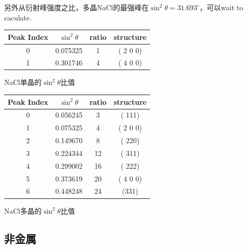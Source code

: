 \documentclass[10pt]{ctexart}
\begin{document}
另外从衍射峰强度之比，多晶NaCl的最强峰在$\sin^2{\theta}= 31.693^\circ$，可以wait to caculate.

\begin{minipage}{0.45\textwidth}
    {\small
    \begin{tabular}{|c|c|c|c|}
        \textbf{Peak Index} & \textbf{$\sin^2{\theta}$}& \textbf{ratio}& \textbf{structure}\\
        \hline
        0  &  0.075325&1&( 2 0 0)\\
    1  &  0.301746&4&( 4 0 0)\\
    \end{tabular}
    }
    \centering
    NaCl单晶的$\sin^2{\theta}$比值
    \label{tab:NaCl_sPeakRatio}
    
\end{minipage}
\begin{minipage}{0.45\textwidth}
    {\small
    \begin{tabular}{|c|c|c|c|}
        \textbf{Peak Index} & \textbf{$\sin^2{\theta}$}& \textbf{ratio}& \textbf{structure}\\
        \hline
        0  &  0.056245&3&( 111)\\
        1  &  0.075325&4&( 2 0 0)\\
        2  &  0.149670&8&( 220)\\
        3  &  0.224344&12&( 311)\\
        4  &  0.299002&16&( 222)\\
        5  &  0.373619&20&( 4 0 0)\\
        6  &  0.448248&24&(331)\\
    \end{tabular}
    }
    \centering
    NaCl多晶的$\sin^2{\theta}$比值
    \label{tab:NaCl_mPeakRatio}
\end{minipage}
\subsection{非金属}
\end{document}
